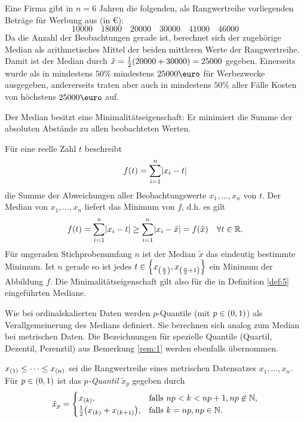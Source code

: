 \documentclass{lecture}
\begin{document}
    \begin{example}
        Eine Firma gibt in \(n = 6\) Jahren die folgenden, als Rangwertreihe vorliegenden Beträge für Werbung aus (in \euro):
        \[
            10000 \quad 18000 \quad 20000 \quad 30000 \quad 41000 \quad 46000
        \]
        Da die Anzahl der Beobachtungen gerade ist, berechnet sich der zugehörige Median als arithmetisches Mittel der beiden mittleren Werte der Rangwertreihe.
        Damit ist der Median durch \(\tilde{x} = \frac{1}{2}\parentheses*{20000 + 30000} = 25000\) gegeben.
        Einerseits wurde als in mindestens \(50\%\) mindestens \(25000\text{\euro}\) für Werbezwecke ausgegeben, andererseits traten aber auch in mindestens \(50\%\) aller Fälle Kosten von höchstens \(25000\text{\euro}\) auf.
    \end{example}

    Der Median besitzt eine Minimalitätseigenschaft: Er minimiert die Summe der absoluten Abstände zu allen beobachteten Werten.

    \begin{calcrule}
        Für eine reelle Zahl \(t\) beschreibt
        \[
            f\parentheses*{t} = \sum_{i = 1}^n \absolute*{x_i - t}
        \]
        die Summe der Abweichungen aller Beobachtungswerte \(x_1, \ldots, x_n\) von \(t\).
        Der Median von \(x_1, \ldots, x_n\) liefert das Minimum von \(f\), d.h. es gilt
        \[
            f\parentheses*{t} = \sum_{i = 1}^n \absolute*{x_i - t} \ge \sum_{i = 1}^n \absolute*{x_i - \tilde{x}} = f\parentheses*{\tilde{x}} \quad \forall t \in \R.
        \]
        Für ungeraden Stichprobenumfang \(n\) ist der Median \(\tilde{x}\) das eindeutig bestimmte Minimum.
        Ist \(n\) gerade so ist jedes \(t \in \braces*{x_{\parentheses*{\frac{n}{2}}}, x_{\parentheses*{\frac{n}{2} + 1}}}\) ein Minimum der Abbildung \(f\).
        Die Minimalitätseigenschaft gilt also für die in Definition \ref{def:5} eingeführten Mediane.
    \end{calcrule}

    Wie bei ordinalskalierten Daten werden \(p\)-Quantile (mit \(p \in \parentheses*{0, 1}\)) als Verallgemeinerung des Medians definiert.
    Sie berechnen sich analog zum Median bei metrischen Daten.
    Die Bezeichnungen für spezielle Quantile (Quartil, Dezentil, Perenztil) aus Bemerkung \ref{rem:1} werden ebenfalls übernommen.

    \begin{definition}
        \(x_{\parentheses*{1}} \le \cdots \le x_{\parentheses*{n}}\) sei die Rangwertreihe eines metrischen Datensatzes \(x_1, \ldots, x_n\).
        Für \(p \in \parentheses*{0, 1}\) ist das \emph{\(p\)-Quantil} \(\tilde{x}_p\) gegeben durch
        \[
            \tilde{x}_p = \begin{cases}
                x_{\parentheses*{k}}, & \text{falls }np < k < np + 1, np \not\in \N,\\
                \frac{1}{2}\parentheses*{x_{\parentheses*{k}} + x_{\parentheses*{k + 1}}}, & \text{falls }k = np, np \in \N.
            \end{cases}
        \]
    \end{definition}
\end{document}
